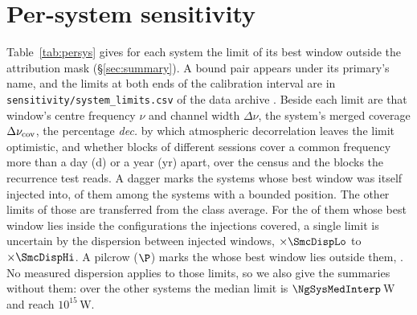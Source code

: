 \section{Per-system sensitivity}
\label{app:persys}

Table~\ref{tab:persys} gives for each system the limit of its best window
outside the attribution mask (\S\ref{sec:summary}). A bound pair appears
under its primary's name, and the limits at both ends of the calibration
interval are in \texttt{sensitivity/\allowbreak system\_limits.csv} of the
data archive \citep{SIdeposit}. Beside each limit are that window's centre
frequency $\nu$ and channel width $\Delta\nu$, the system's merged coverage
$\Delta\nu_{\rm cov}$, the percentage \emph{dec.} by which atmospheric
decorrelation leaves the limit optimistic, and whether blocks of different
sessions cover a common frequency more than a day (d) or a year (yr) apart,
over the census and the \ZcNRecEB{} blocks the recurrence test reads. A
dagger marks the \SmcNMeasSys{} systems whose best window was itself injected
into, \SmcNMeasSysBnd{} of them among the \NSysALimSum{} systems with a bounded
position. The other \SmcNEstSysBnd{} limits of those \NSysALimSum{} are transferred
from the class average. For the \NgNInterpEstSysBnd{} of them whose best window
lies inside the configurations the injections covered, a single limit is
uncertain by the dispersion between injected windows, $\times\SmcDispLo$ to
$\times\SmcDispHi$. A pilcrow ($\P$) marks the \NgNExtrapSys{}
\NgExtrapSysNoun{} whose best window lies outside them, \NgExtrapSys. No
measured dispersion applies to those limits, so we also give the summaries
without them: over the other \NgNSysInterpSum{} systems the median limit is
$\NgSysMedInterp$\,W and \NgNSysEfifteenInterp{} reach $10^{15}$\,W.

